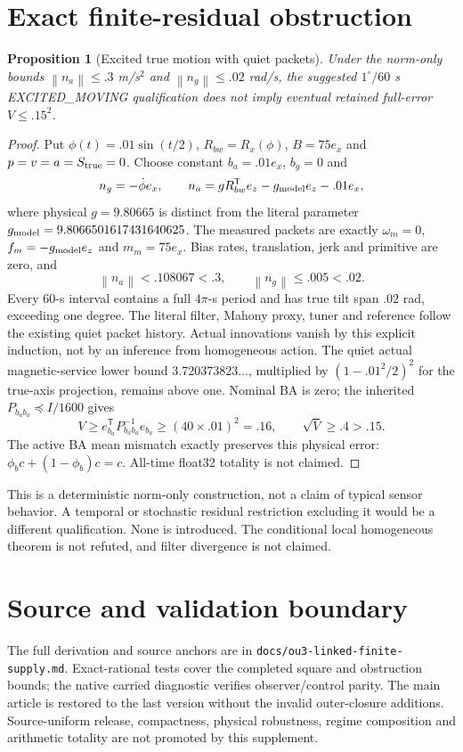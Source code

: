 \documentclass[11pt]{article}
\newtheorem{proposition}{Proposition}
\newcommand{\norm}[1]{\left\lVert#1\right\rVert}
\begin{document}
\section{Exact finite-residual obstruction}
\begin{proposition}[Excited true motion with quiet packets]
Under the norm-only bounds $\norm{n_a}\le.3$ m/s$^2$ and
$\norm{n_g}\le.02$ rad/s, the suggested $1^\circ/60$ s EXCITED\_MOVING
qualification does not imply eventual retained full-error $V\le.15^2$.
\end{proposition}
\begin{proof}
Put $\phi(t)=.01\sin(t/2)$, $R_{bw}=R_x(\phi)$, $B=75e_x$ and
$p=v=a=S_{\rm true}=0$. Choose constant $b_a=.01e_x$, $b_g=0$ and
\[
 n_g=-\dot\phi e_x,\qquad
 n_a=gR_{bw}^{\mathsf T}e_z-g_{\rm model}e_z-.01e_x,
\]
where physical $g=9.80665$ is distinct from the literal parameter
$g_{\rm model}=9.8066501617431640625$.
The measured packets are exactly $\omega_m=0$, $f_m=-g_{\rm model}e_z$ and
$m_m=75e_x$. Bias rates, translation, jerk and primitive are zero, and
\[
 \norm{n_a}<.108067<.3,\qquad \norm{n_g}\le.005<.02.
\]
Every 60-s interval contains a full $4\pi$-s period and has true tilt span
$.02$ rad, exceeding one degree. The literal filter, Mahony proxy, tuner and
reference follow the existing quiet packet history. Actual innovations vanish
by this explicit induction, not by an inference from homogeneous action.
The quiet actual magnetic-service lower bound $3.720373823\ldots$, multiplied
by $(1-.01^2/2)^2$ for the true-axis projection, remains above one.
Nominal BA is zero; the inherited $P_{b_ab_a}\preceq I/1600$ gives
\[
 V\ge e_{b_a}^{\mathsf T}P_{b_ab_a}^{-1}e_{b_a}
 \ge(40\times.01)^2=.16,\qquad \sqrt V\ge.4>.15.
\]
The active BA mean mismatch exactly preserves this physical error:
$\phi_b c+(1-\phi_b)c=c$. All-time float32 totality is not claimed.
\end{proof}
This is a deterministic norm-only construction, not a claim of typical
sensor behavior. A temporal or stochastic residual restriction excluding it
would be a different qualification. None is introduced. The conditional local
homogeneous theorem is not refuted, and filter divergence is not claimed.

\section{Source and validation boundary}
The full derivation and source anchors are in
\texttt{docs/ou3-linked-finite-supply.md}. Exact-rational tests cover the
completed square and obstruction bounds; the native carried diagnostic verifies
observer/control parity. The main article is restored to the last version
without the invalid outer-closure additions. Source-uniform release,
compactness, physical robustness, regime composition and arithmetic totality
are not promoted by this supplement.
\end{document}

